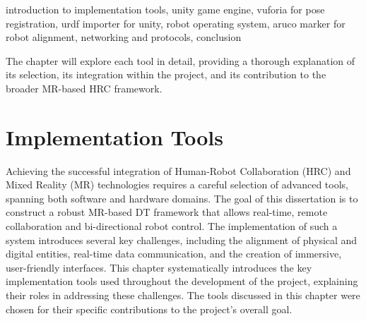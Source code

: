 











introduction to implementation tools, unity game engine, vuforia for pose registration, urdf importer for unity, robot operating system, aruco marker for robot alignment, networking and protocols, conclusion

The chapter will explore each tool in detail, providing a thorough explanation of its selection, its integration within the project, and its contribution to the broader \ac{MR}-based \ac{HRC} framework.

\chapter{Implementation Tools}%
\label{chapter:tools}

Achieving the successful integration of Human-Robot Collaboration (\ac{HRC}) and Mixed Reality (\ac{MR}) technologies requires a careful selection of advanced tools, spanning both software and hardware domains. The goal of this dissertation is to construct a robust \ac{MR}-based \ac{DT} framework that allows real-time, remote collaboration and bi-directional robot control. The implementation of such a system introduces several key challenges, including the alignment of physical and digital entities, real-time data communication, and the creation of immersive, user-friendly interfaces. This chapter systematically introduces the key implementation tools used throughout the development of the project, explaining their roles in addressing these challenges. 
The tools discussed in this chapter were chosen for their specific contributions to the project’s overall goal. 

